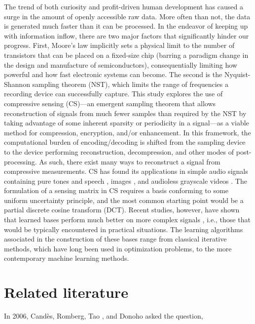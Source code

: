 The trend of both curiosity and profit-driven human development has caused a surge in the amount of openly accessible raw data. More often than not, the data is generated much faster than it can be processed. In the endeavor of keeping up with information inflow, there are two major factors that significantly hinder our progress. First, Moore's law implicitly sets a physical limit to the number of transistors that can be placed on a fixed-size chip (barring a paradigm change in the design and manufacture of semiconductors), consequentially limiting how powerful and how fast electronic systems can become. The second is the Nyquist-Shannon sampling theorem (NST), which limits the range of frequencies a recording device can successfully capture. This study explores the use of compressive sensing (CS)---an emergent sampling theorem that allows reconstruction of signals from much fewer samples than required by the NST by taking advantage of some inherent sparsity or periodicity in a signal---as a viable method for compression, encryption, and/or enhancement. In this framework, the computational burden of encoding/decoding is shifted from the sampling device to the device performing reconstruction, decompression, and other modes of post-processing. As such, there exist many ways to reconstruct a signal from compressive measurements. CS has found its applications in simple audio signals containing pure tones \cite{Mathew2016,Andras2018} and speech \cite{Low2013,Low2018,Abrol2015}, images \cite{Mo2013,Zhou2016,Romero2016}, and audioless grayscale videos \cite{Liu2014,Chen2014}. The formulation of a sensing matrix in CS requires a basis conforming to some uniform uncertainty principle, and the most common starting point would be a partial discrete cosine transform (DCT). Recent studies, however, have shown that learned bases perform much better on more complex signals \cite{Liu2013,Sharma2018,Eslahi2016}, i.e., those that would be typically encountered in practical situations. The learning algorithms associated in the construction of these bases range from classical iterative methods, which have long been used in optimization problems, to the more contemporary machine learning methods.


\section{Related literature}
\label{sec:rrl}
In 2006, Cand\`{e}s, Romberg, Tao \cite{Candes2006}, and Donoho \cite{Donoho2006} asked the question, 

